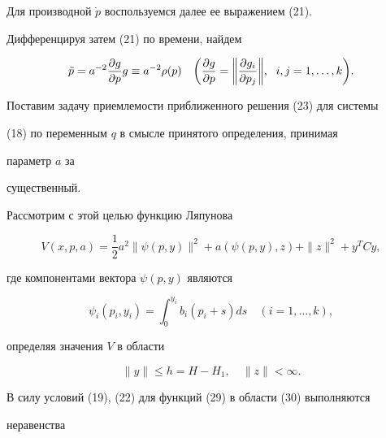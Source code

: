 Для производной $\Dot p$ воспользуемся далее ее выражением (21).  


Дифференцируя затем (21) по времени, найдем 


\begin{equation} 


\Ddot p=a^{-2}\frac{\partial g}{\partial p}g\equiv 


a^{-2}\rho(p)\quad \biggl(\frac{\partial g}{\partial p}= 


\bigg\|\frac{\partial g_i}{\partial p_j}\bigg\|, 


\ \;i,j=1,\dotsc,k\biggr). 


\end{equation} 


 


Поставим задачу приемлемости приближенного решения (23) для системы  


(18) по переменным $q$ в смысле принятого определения, принимая  


параметр $a$ за  


существенный. 


Рассмотрим с этой целью функцию Ляпунова 


\begin{equation} 


V(x,p,a)=\frac{1}{2}a^2\|\psi(p,y)\|^2+a(\psi(p,y),z)+ 


\|z\|^2+y^T C y, 


\end{equation} 


где компонентами вектора $\psi(p,y)$ являются 


\begin{equation} 


\psi_i(p_i,y_i)=\int^{y_i}_0 b_i(p_i+s)ds\quad 


(i=1,\dotsc,k), 


\end{equation} 


определяя значения $V$ в области 


\begin{equation} 


\|y\|\le h=H-H_1,\quad \|z\|<\infty. 


\end{equation} 


 


В силу условий (19), (22) для функций (29) в области (30) выполняются  


неравенства 


